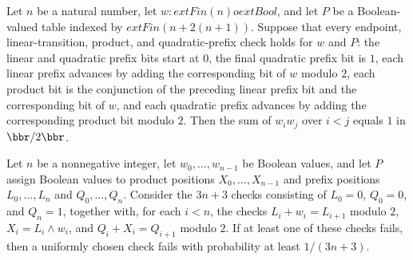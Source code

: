 \begin{theorem}
\label{FABL.isCompleteQuadraticOne_of_linearChecks}
\leanok
{}
Let $n$ be a natural number, let $w:	ext{Fin}(n)	o	ext{Bool}$, and let $P$ be a
Boolean-valued table indexed by $	ext{Fin}(n+2(n+1))$. Suppose that every endpoint,
linear-transition, product, and quadratic-prefix check holds for $w$ and $P$: the linear
and quadratic prefix bits start at $0$, the final quadratic prefix bit is $1$, each
linear prefix advances by adding the corresponding bit of $w$ modulo $2$, each product
bit is the conjunction of the preceding linear prefix bit and the corresponding bit of
$w$, and each quadratic prefix advances by adding the corresponding product bit modulo
$2$. Then the sum of $w_iw_j$ over $i<j$ equals $1$ in $\bbr/2\bbr$.
\end{theorem}

\begin{theorem}
\label{FABL.one_div_checkCount_le_completeQuadratic_failedCheckProbability}
\leanok
{}
Let $n$ be a nonnegative integer, let $w_0,\ldots,w_{n-1}$ be Boolean values, and let
$P$ assign Boolean values to product positions $X_0,\ldots,X_{n-1}$ and prefix positions
$L_0,\ldots,L_n$ and $Q_0,\ldots,Q_n$. Consider the $3n+3$ checks consisting of $L_0=0$,
$Q_0=0$, and $Q_n=1$, together with, for each $i<n$, the checks $L_i+w_i=L_{i+1}$ modulo
$2$, $X_i=L_i\land w_i$, and $Q_i+X_i=Q_{i+1}$ modulo $2$. If at least one of these
checks fails, then a uniformly chosen check fails with probability at least $1/(3n+3)$.
\end{theorem}

